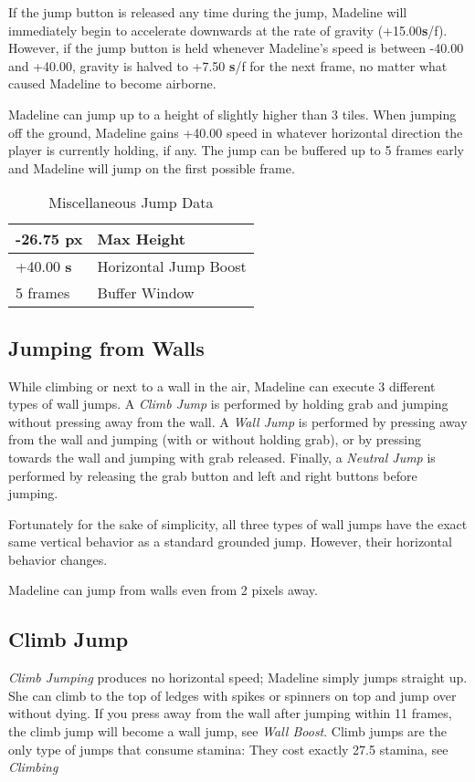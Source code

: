 \documentclass[oneside]{book}
\newcommand{\s}{\textbf{s}}
\begin{document}
If the jump button is released any time during the jump, Madeline will immediately begin to accelerate downwards at the rate of gravity (+15.00\s /f). However, if the jump button is held whenever Madeline's speed is between -40.00 and +40.00, gravity is halved to +7.50 \s/f  for the next frame, no matter what caused Madeline to become airborne.

Madeline can jump up to a height of slightly higher than 3 tiles. When jumping off the ground, Madeline gains +40.00 speed in whatever horizontal direction the player is currently holding, if any. The jump can be buffered up to 5 frames early and Madeline will jump on the first possible frame.

\begin{table}[h]
\begin{tabular}{|l|l|}
\hline
-26.75 px&Max Height\\
\hline
+40.00 \s &Horizontal Jump Boost\\
\hline
5 frames&Buffer Window\\
\hline
\end{tabular}
\caption{Miscellaneous Jump Data}
\end{table}

\subsection{Jumping from Walls}

While climbing or next to a wall in the air, Madeline can execute 3 different types of wall jumps. A \textit{Climb Jump} is performed by holding grab and jumping without pressing away from the wall. A \textit{Wall Jump} is performed by pressing away from the wall and jumping (with or without holding grab), or by pressing towards the wall and jumping with grab released. Finally, a \textit{Neutral Jump} is performed by releasing the grab button and left and right buttons before jumping.

Fortunately for the sake of simplicity, all three types of wall jumps have the exact same vertical behavior as a standard grounded jump. However, their horizontal behavior changes.

Madeline can jump from walls even from 2 pixels away.

\subsection{Climb Jump}

\textit{Climb Jumping} produces no horizontal speed; Madeline simply jumps straight up. She can climb to the top of ledges with spikes or spinners on top and jump over without dying. If you press away from the wall after jumping within 11 frames, the climb jump will become a wall jump, see \textit{Wall Boost}. Climb jumps are the only type of jumps that consume stamina: They cost exactly 27.5 stamina, see \textit{Climbing}
\end{document}
